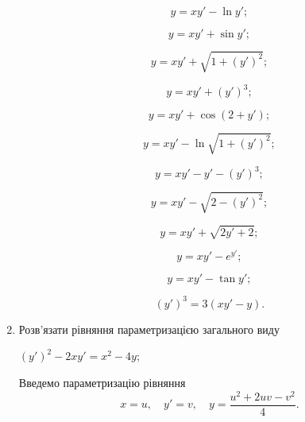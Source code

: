 \begin{enumerate}
\begin{multicols}{2}
		\begin{problem}
			\[ y=xy'-\ln y'; \]
		\end{problem}
		
		\begin{problem}
			\[ y=xy'+\sin y'; \]
		\end{problem}
		
		\begin{problem}
			\[ y=xy'+\sqrt{1+(y')^2}; \]
		\end{problem}
		
		\begin{problem}
			\[ y=xy'+(y')^3; \]
		\end{problem}
		
		\begin{problem}
			\[ y=xy'+\cos(2+y'); \]
		\end{problem}
		
		\begin{problem}
			\[ y=xy'-\ln\sqrt{1+(y')^2}; \]
		\end{problem}
		
		\begin{problem}
			\[ y=xy'-y'-(y')^3; \]
		\end{problem}
		
		\begin{problem}
			\[ y=xy'-\sqrt{2-(y')^2}; \]
		\end{problem}
		
		\begin{problem}
			\[ y=xy'+\sqrt{2y'+2}; \]
		\end{problem}
		
		\begin{problem}
			\[ y=xy'-e^{y'}; \]
		\end{problem}
		
		\begin{problem}
			\[ y=xy'-\tan y'; \]
		\end{problem}
		
		\begin{problem}
			\[ (y')^3=3(xy'-y). \]
		\end{problem}
	\end{multicols}

	\item Розв'язати рівняння параметризацією загального виду
	\begin{example}
		$(y')^2 - 2 x y' = x^2 - 4y$;
	\end{example}

	\begin{solution}
		Введемо параметризацію рівняння \[x = u, \quad y' = v, \quad y = \frac {u^2 + 2 u v - v^2}{4}.\] 


\end{solution}
\end{enumerate}
